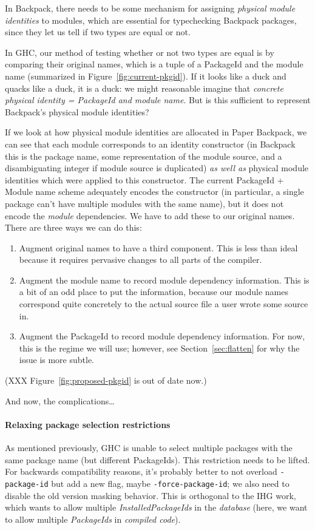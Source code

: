 \documentclass{article}
\begin{document}
In Backpack, there needs to be some mechanism for assigning
\emph{physical module identities} to modules, which are essential for
typechecking Backpack packages, since they let us tell if two types are
equal or not.

In GHC, our method of testing whether or not two types are equal is by
comparing their original names, which is a tuple of a PackageId and the
module name (summarized in Figure~\ref{fig:current-pkgid}).  If it looks
like a duck and quacks like a duck, it is a duck: we might reasonable
imagine that \emph{concrete physical identity = PackageId and module
name}.  But is this sufficient to represent Backpack's physical module
identities?

If we look at how physical module identities are allocated in Paper Backpack,
we can see that each module corresponds to an identity constructor (in
Backpack this is the package name, some representation of the module
source, and a disambiguating integer if module source is duplicated)
\emph{as well as} physical module identities which were applied to
this constructor.  The current PackageId + Module name scheme adequately encodes
the constructor (in particular, a single package can't have multiple modules
with the same name), but it does not encode the \emph{module} dependencies.
We have to add these to our original names.  There are three ways we can do
this:

\begin{enumerate}
    \item Augment original names to have a third component.  This is less than ideal because it requires pervasive changes to all parts of the compiler.
    \item Augment the module name to record module dependency information.  This is a bit of an odd place to put the information, because our module names correspond quite concretely to the actual source file a user wrote some source in.
    \item Augment the PackageId to record module dependency information.  For now, this is the regime we will use; however, see Section~\ref{sec:flatten} for why the issue is more subtle.
\end{enumerate}

(XXX Figure~\ref{fig:proposed-pkgid} is out of date now.)

And now, the complications\ldots

\paragraph{Relaxing package selection restrictions}  As mentioned
previously, GHC is unable to select multiple packages with the same
package name (but different PackageIds).  This restriction needs to be
lifted.  For backwards compatibility reasons, it's probably better to
not overload \verb|-package-id| but add a new flag, maybe \verb|-force-package-id|;
we also need to disable the old version masking behavior.  This is orthogonal
to the IHG work, which wants to allow multiple \emph{InstalledPackageIds} in the
\emph{database} (here, we want to allow multiple \emph{PackageIds} in \emph{compiled code}).
\end{document}
